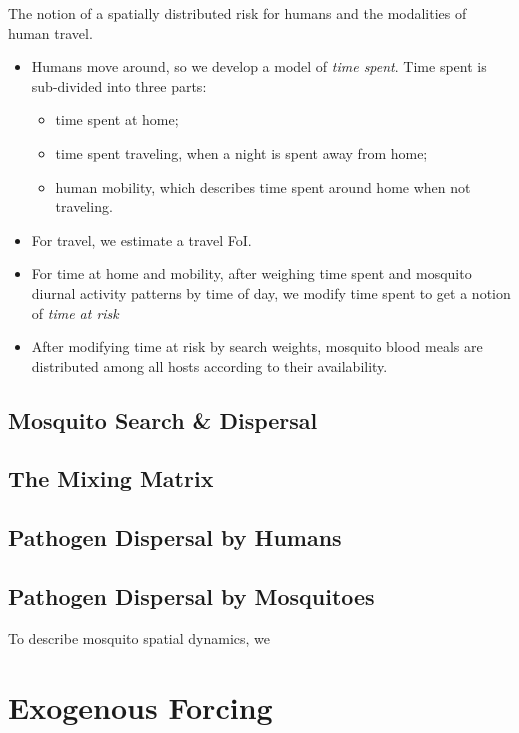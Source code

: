 \documentclass[
]{book}
\begin{document}
The notion of a spatially distributed risk for humans and the modalities of human travel.

\begin{itemize}
\item
  Humans move around, so we develop a model of \emph{time spent}. Time spent is sub-divided into three parts:

  \begin{itemize}
  \item
    time spent at home;
  \item
    time spent traveling, when a night is spent away from home;
  \item
    human mobility, which describes time spent around home when not traveling.
  \end{itemize}
\item
  For travel, we estimate a travel FoI.
\item
  For time at home and mobility, after weighing time spent and mosquito diurnal activity patterns by time of day, we modify time spent to get a notion of \emph{time at risk}
\item
  After modifying time at risk by search weights, mosquito blood meals are distributed among all hosts according to their availability.
\end{itemize}

\subsection{Mosquito Search \& Dispersal}\label{mosquito-search-dispersal}

\subsection{The Mixing Matrix}\label{the-mixing-matrix}

\subsection{Pathogen Dispersal by Humans}\label{pathogen-dispersal-by-humans}

\subsection{Pathogen Dispersal by Mosquitoes}\label{pathogen-dispersal-by-mosquitoes}

To describe mosquito spatial dynamics, we

\section{Exogenous Forcing}\label{exogenous-forcing-1}
\end{document}
